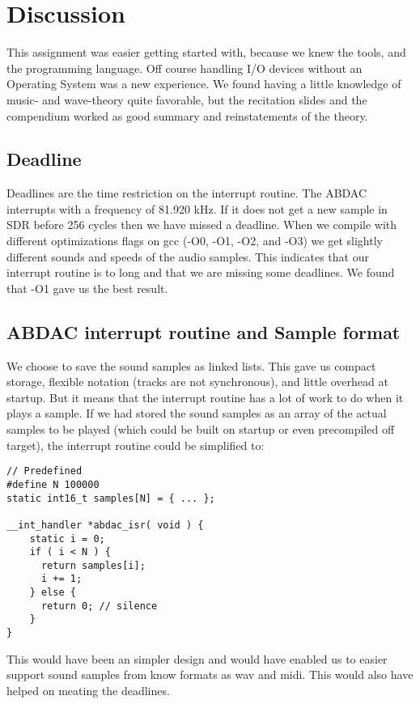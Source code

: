 \section{Discussion}
This assignment was easier getting started with, because we knew the tools,  and the programming language.
Off course handling I/O devices without an Operating System was a new experience. We found having a little
knowledge of music- and wave-theory quite favorable, but the recitation slides and the compendium worked as
good summary and reinstatements of the theory.

\subsection{Deadline}
Deadlines are the time restriction on the interrupt routine. The ABDAC interrupts with a frequency of 81.920 kHz.
If it does not get a new sample in SDR before 256 cycles then we have missed a deadline. When we compile with
different optimizations flags on gcc (-O0, -O1, -O2, and -O3) we get slightly different sounds and speeds of the
audio samples. This indicates that our interrupt routine is to long and that we are missing some deadlines.
We found that -O1 gave us the best result.

\subsection{ABDAC interrupt routine and Sample format}
We choose to save the sound samples as linked lists. This gave us compact storage, flexible notation (tracks are not
synchronous), and little overhead at startup. But it means that the interrupt routine has a lot of work to do when it
plays a sample. If we had stored the sound samples as an array of the actual samples to be played (which could be built
on startup or even precompiled off target), the interrupt routine could be simplified to:

\begin{lstlisting}
// Predefined
#define N 100000
static int16_t samples[N] = { ... };

__int_handler *abdac_isr( void ) {
    static i = 0;
    if ( i < N ) {
      return samples[i];
      i += 1;
    } else {
      return 0; // silence
    }
}
\end{lstlisting}
This would have been an simpler design and would have enabled us to easier support sound samples from know formats
as wav and midi. This would also have helped on meating the deadlines.
